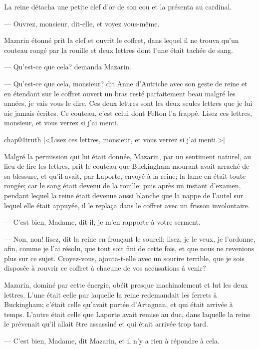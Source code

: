 La reine détacha une petite clef d'or de son cou et la présenta au cardinal.

— Ouvrez, monsieur, dit-elle, et voyez vous-même.

Mazarin étonné prit la clef et ouvrit le coffret, dans lequel il ne trouva qu'un couteau rongé par la rouille et deux lettres dont l'une était tachée de sang.

— Qu'est-ce que cela? demanda Mazarin.

— Qu'est-ce que cela, monsieur? dit Anne d'Autriche avec son geste de reine et en étendant sur le coffret ouvert un bras resté parfaitement beau malgré les années, je vais vous le dire. Ces deux lettres sont les deux seules lettres que je lui aie jamais écrites. Ce couteau, c'est celui dont Felton l'a frappé. Lisez ces lettres, monsieur, et vous verrez si j'ai menti.

\begin{bwbigpic}
	[\basicscale] 
	{chap04truth}
	[<Lisez ces lettres, monsieur, et vous verrez si j'ai menti.>]
\end{bwbigpic}

Malgré la permission qui lui était donnée, Mazarin, par un sentiment naturel, au lieu de lire les lettres, prit le couteau que Buckingham mourant avait arraché de sa blessure, et qu'il avait, par Laporte, envoyé à la reine; la lame en était toute rongée; car le sang était devenu de la rouille; puis après un instant d'examen, pendant lequel la reine était devenue aussi blanche que la nappe de l'autel sur lequel elle était appuyée, il le replaça dans le coffret avec un frisson involontaire.

— C'est bien, Madame, dit-il, je m'en rapporte à votre serment.

— Non, non! lisez, dit la reine en fronçant le sourcil; lisez, je le veux, je l'ordonne, afin, comme je l'ai résolu, que tout soit fini de cette fois, et que nous ne revenions plus sur ce sujet. Croyez-vous, ajouta-t-elle avec un sourire terrible, que je sois disposée à rouvrir ce coffret à chacune de vos accusations à venir?

Mazarin, dominé par cette énergie, obéit presque machinalement et lut les deux lettres. L'une était celle par laquelle la reine redemandait les ferrets à Buckingham; c'était celle qu'avait portée d'Artagnan, et qui était arrivée à temps. L'autre était celle que Laporte avait remise au duc, dans laquelle la reine le prévenait qu'il allait être assassiné et qui était arrivée trop tard.

— C'est bien, Madame, dit Mazarin, et il n'y a rien à répondre à cela.

